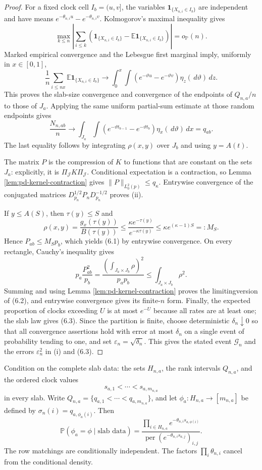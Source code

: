 \documentclass[11pt]{article}
\theoremstyle{remark}
\newcommand{\Pp}{\mathbb P}
\newcommand{\Ee}{\mathbb E}
\newcommand{\one}{\mathbf 1}
\newcommand{\dd}{\,d}
\begin{document}
\begin{proof}
For a fixed clock cell $I_b=(u,v]$, the variables
$\one_{\{X_{n,i}\in I_b\}}$ are independent and have means
$e^{-\theta_{n,i}u}-e^{-\theta_{n,i}v}$.  Kolmogorov's maximal inequality
gives
\[
 \max_{k\le n}\left|\sum_{i\le k}
 \left(\one_{\{X_{n,i}\in I_b\}}
 -\Ee\one_{\{X_{n,i}\in I_b\}}\right)\right|=o_{\Pp}(n).
\]
Marked empirical convergence and the Lebesgue first marginal imply, uniformly
in $x\in[0,1]$,
\[
 \frac1n\sum_{i\le nx}
 \Ee\one_{\{X_{n,i}\in I_b\}}
 \longrightarrow
 \int_0^x\int
 (e^{-\vartheta u}-e^{-\vartheta v})
 \eta_z(\dd\vartheta)\dd z.
\]
This proves the slab-size convergence and convergence of the endpoints of
$Q_{n,a}/n$ to those of $J_a$.  Applying the same uniform partial-sum estimate
at those random endpoints gives
\[
 \frac{N_{n,ab}}n\longrightarrow
 \int_{J_a}\int
 (e^{-\vartheta t_{b-1}}-e^{-\vartheta t_b})
 \eta_x(\dd\vartheta)\dd x=q_{ab}.
\]
The last equality follows by integrating $\rho(x,y)$ over $J_b$ and using
$y=A(t)$.

The matrix $P$ is the compression of $K$ to functions that are constant on the
sets $J_a$: explicitly, it is $\Pi_{\mathcal J}K\Pi_{\mathcal J}$.  Conditional
expectation is a contraction, so Lemma \ref{lem:pd-kernel-contraction} gives
$\|P\|_{L^2_0(p)}\le q_\kappa$.  Entrywise convergence of the conjugated
matrices
$D_{p_n}^{1/2}P_nD_{p_n}^{-1/2}$ proves (ii).

If $y\le A(S)$, then $\tau(y)\le S$ and
\[
 \rho(x,y)
 =\frac{g_x(\tau(y))}{B(\tau(y))}
 \le\frac{\kappa e^{-\tau(y)}}{e^{-\kappa\tau(y)}}
 \le\kappa e^{(\kappa-1)S}=:M_S.
\]
Hence $P_{ab}\le M_Sp_b$, which yields (6.1) by entrywise convergence.  On
every rectangle, Cauchy's inequality gives
\[
 p_a\frac{P_{ab}^2}{p_b}
 =\frac{(\int_{J_a\times J_b}\rho)^2}{p_ap_b}
 \le\int_{J_a\times J_b}\rho^2.
\]
Summing and using Lemma \ref{lem:pd-kernel-contraction} proves the limitingversion of (6.2), and entrywise convergence gives its finite-$n$ form.  Finally,
the expected proportion of clocks exceeding $U$ is at most $e^{-U}$ because
all rates are at least one; the slab law gives (6.3).  Since the partition is finite, choose deterministic $\delta_n\downarrow0$
so that all convergence assertions hold with error at most $\delta_n$ on a
single event of probability tending to one, and set
$\varepsilon_n=\sqrt{\delta_n}$.  This gives the stated event
$\mathcal G_n$ and the errors $\varepsilon_n^2$ in (i) and (6.3).
\end{proof}

Condition on the complete slab data: the sets $H_{n,a}$, the rank intervals
$Q_{n,a}$, and the ordered clock values
\[
        s_{a,1}<\cdots<s_{a,m_{n,a}}
\]
in every slab.  Write
$Q_{n,a}=\{q_{a,1}<\cdots<q_{a,m_{n,a}}\}$, and let
$\phi_a:H_{n,a}\to[m_{n,a}]$ be defined by
$\sigma_n(i)=q_{a,\phi_a(i)}$.  Then
\begin{equation}
 \Pp(\phi_a=\phi\mid\text{slab data})
 =\frac{\prod_{i\in H_{n,a}}e^{-\theta_{n,i}s_{a,\phi(i)}}}
 {\operatorname{per}(e^{-\theta_{n,i}s_{a,j}})_{i,j}}.
 \tag{6.3a}\label{eq:pd-permanental-row}
\end{equation}
The row matchings are conditionally independent.  The factors
$\prod_i\theta_{n,i}$ cancel from the conditional density.
\end{document}
